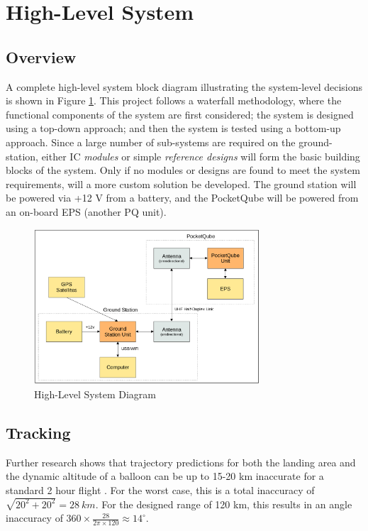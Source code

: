 \graphicspath{{./figures}}

\section{High-Level System}
\subsection{Overview}
A complete high-level system block diagram illustrating the system-level decisions is shown in Figure \ref{fig:complete_system}. This project follows a waterfall methodology, where the functional components of the system are first considered; the system is designed using a top-down approach; and then the system is tested using a bottom-up approach. Since a large number of sub-systems are required on the ground-station, either IC \textit{modules} or simple \textit{reference designs} will form the basic building blocks of the system. Only if no modules or designs are found to meet the system requirements, will a more custom solution be developed. The ground station will be powered via +12 V from a battery, and the PocketQube will be powered from an on-board EPS (another PQ unit).

\begin{figure}[!htb]
    \centering
    \includegraphics[width=0.75\textwidth]{complete_system.png}
    \caption{High-Level System Diagram}
    \label{fig:complete_system}
  \end{figure}

\subsection{Tracking}\label{sec:tracking}
Further research shows that trajectory predictions for both the landing area and the dynamic altitude of a balloon can be up to 15-20 km inaccurate for a standard 2 hour flight \cite{paper-balloonTrajectoryAnalysis}. For the worst case, this is a total inaccuracy of $\sqrt{20^2 + 20^2} = \SI{28}{km}$. For the designed range of 120 km, this results in an angle inaccuracy of $360 \times \frac{28}{2 \pi \times 120} \approx 14^\circ$.

